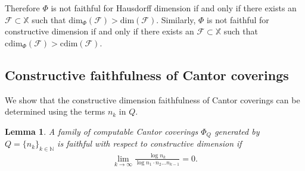 \documentclass[11pt]{article}
\newtheorem{lemma}{Lemma}
\newcommand{\N}{\mathbb{N}}
\newcommand{\cdim}{\mathrm{cdim}}
\renewcommand{\dim}{{\mathrm{dim}}}
\newcommand{\F}{{\mathcal{F}}}
\newcommand{\X}{{\mathbb{X}}}
\renewcommand{\F}{\mathcal{F}}
\begin{document}
Therefore  $\Phi$ is not faithful for Hausdorff dimension if and only if there exists an $\F \subset \X$ such that $\dim_{\Phi}(\F) > \dim(\F)$. Similarly, $\Phi$ is not faithful for constructive dimension if and only if there exists an $\F \subset \X$ such that $\cdim_{\Phi}(\F) > \cdim(\F)$.


\subsection{ Constructive faithfulness of Cantor coverings}

We show that the constructive dimension faithfulness of Cantor coverings can be determined using the terms $n_k$ in $Q$.

\begin{lemma} \label{lem:EffFaithCondn1}
	A family of computable Cantor coverings $\Phi_Q$ generated by $Q =
	\{n_k\}_{k \in \N}$ is faithful with respect to constructive
	dimension if  	
	\begin{align*}
		\lim_{k\rightarrow \infty} \frac{\log n_k}{\log n_1 \cdot n_2
			\dots n_{k-1}} = 0.
	\end{align*}
\end{lemma}
\end{document}
